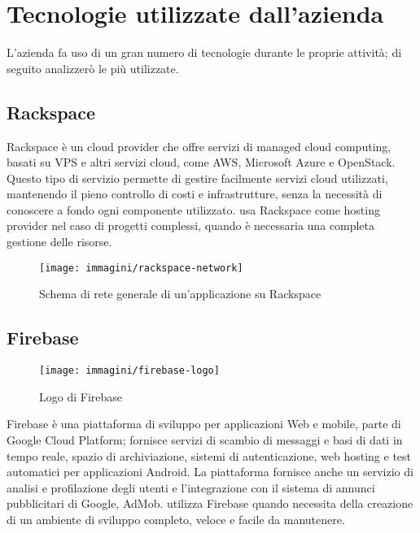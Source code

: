 \section{Tecnologie utilizzate dall'azienda}
L'azienda fa uso di un gran numero di tecnologie durante le proprie attività; di seguito analizzerò le più utilizzate.

   \subsection{Rackspace}
   Rackspace è un cloud provider che offre servizi di managed cloud computing, basati su \gls{VPS} e altri servizi cloud, come \gls{AWS}, Microsoft Azure e OpenStack. Questo tipo di servizio permette di gestire facilmente servizi cloud utilizzati, mantenendo il pieno controllo di costi e infrastrutture, senza la necessità di conoscere a fondo ogni componente utilizzato. 
   \nomeAzienda{} usa Rackspace come hosting provider nel caso di progetti complessi, quando è necessaria una completa gestione delle risorse.
   \begin{figure}[H]
      \begin{center}
      \texttt{[image: immagini/rackspace-network]}
      \end{center}
      \caption{Schema di rete generale di un'applicazione su Rackspace}
   \end{figure}


   \subsection{Firebase}
   \begin{figure}[H]
      \begin{center}
         \texttt{[image: immagini/firebase-logo]}
      \end{center}
      \caption{Logo di Firebase}\label{logofirebase}
   \end{figure}
   Firebase è una piattaforma di sviluppo per applicazioni Web e mobile, parte di Google Cloud Platform; fornisce servizi di scambio di messaggi e basi di dati in tempo reale, spazio di archiviazione, sistemi di autenticazione, web hosting e test automatici per applicazioni Android. La piattaforma fornisce anche un servizio di analisi e profilazione degli utenti e l'integrazione con il sistema di annunci pubblicitari di Google, AdMob.
   \nomeAzienda{} utilizza Firebase quando necessita della creazione di un ambiente di sviluppo completo, veloce e facile da manutenere.

